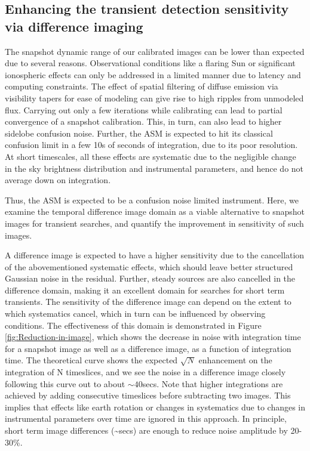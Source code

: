 \documentclass{aa}
\begin{document}
\subsection{\label{sub:Enhancing-the-transient}Enhancing the transient detection
sensitivity via difference imaging} The snapshot dynamic range of our calibrated
images  can  be  lower  than  expected due  to  several  reasons.  Observational
conditions like  a flaring  Sun or significant  ionospheric effects can  only be
addressed  in a limited  manner due  to latency  and computing  constraints. The
effect of spatial  filtering of diffuse emission via  visibility tapers for ease
of modeling  can give rise  to high ripples  from unmodeled flux.   Carrying out
only a  few iterations while  calibrating can lead  to partial convergence  of a
snapshot calibration. This, in turn,  can also lead to higher sidelobe confusion
noise. Further,  the ASM is expected to  hit its classical confusion  limit in a
few  10s  of seconds  of  integration,  due to  its  poor  resolution. At  short
timescales, all these effects are systematic due to the negligible change in the
sky  brightness  distribution and  instrumental  parameters,  and  hence do  not
average down on integration.

Thus, the ASM is expected to  be a confusion noise limited instrument.  Here, we
examine the temporal difference image domain as a viable alternative to snapshot
images for  transient searches, and  quantify the improvement in  sensitivity of
such images.

A  difference  image  is expected  to  have  a  higher  sensitivity due  to  the
cancellation of the abovementioned systematic effects, which should leave better
structured  Gaussian noise  in the  residual. Further,  steady sources  are also
cancelled in the  difference domain, making it an  excellent domain for searches
for short term transients. The sensitivity of the difference image can depend on
the  extent to  which systematics  cancel, which  in turn  can be  influenced by
observing conditions. The effectiveness of this domain is demonstrated in Figure
\ref{fig:Reduction-in-image}, which shows the decrease in noise with integration
time  for a  snapshot image  as well  as a  difference image,  as a  function of
integration  time.   The  theoretical   curve  shows  the   expected  $\sqrt{N}$
enhancement  on the  integration of  N timeslices,  and we  see the  noise  in a
difference image  closely following this  curve out to about  $\sim40$secs. Note
that higher  integrations are achieved  by adding consecutive  timeslices before
subtracting two images. This implies that effects like earth rotation or changes
in systematics due  to changes in instrumental parameters  over time are ignored
in    this   approach.    In   principle,    short   term    image   differences
(\textasciitilde{}secs) are enough to reduce noise amplitude by 20-30\%.
\end{document}
